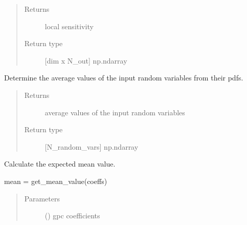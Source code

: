 \documentclass[letterpaper,10pt,english,openany,oneside]{sphinxmanual}
\begin{document}
\begin{fulllineitems}
\begin{fulllineitems}
\begin{quote}
\begin{description}
\begin{itemize}
\end{itemize}

\item[{Returns}] \leavevmode
{} \textendash{} local sensitivity

\item[{Return type}] \leavevmode
{[}dim x N\_out{]} np.ndarray

\end{description}\end{quote}

\end{fulllineitems}


\begin{fulllineitems}
\label{\detokenize{pygpc:pygpc.gpc.gPC.get_mean_random_vars}}
Determine the average values of the input random variables from their pdfs.
\begin{quote}\begin{description}
\item[{Returns}] \leavevmode
{} \textendash{} average values of the input random variables

\item[{Return type}] \leavevmode
{[}N\_random\_vars{]} np.ndarray

\end{description}\end{quote}

\end{fulllineitems}


\begin{fulllineitems}
\label{\detokenize{pygpc:pygpc.gpc.gPC.get_mean_value}}
Calculate the expected mean value.

mean = get\_mean\_value(coeffs)
\begin{quote}\begin{description}
\item[{Parameters}] \leavevmode
{} (\sphinxstyleliteralemphasis{\sphinxupquote{{[}}}\sphinxstyleliteralemphasis{\sphinxupquote{{]} }}) \textendash{} gpc coefficients


\end{description}
\end{quote}
\end{fulllineitems}
\end{fulllineitems}
\end{document}
